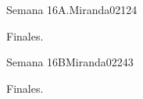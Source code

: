 \begin{syllabus}
\begin{unit}{Semana 16A.}{Miranda02}{12}{4}
   \begin{topics}
      \item Finales.
   \end{topics}
   \begin{unitgoals}
      \item 
   \end{unitgoals}
\end{unit}

\begin{unit}{Semana 16B}{Miranda02}{24}{3}
   \begin{topics}
      \item Finales.
   \end{topics}

   \begin{unitgoals}
      \item 
      \item
      \item 
      \end{unitgoals}
\end{unit}


\begin{coursebibliography}
\end{coursebibliography}

\end{syllabus}

